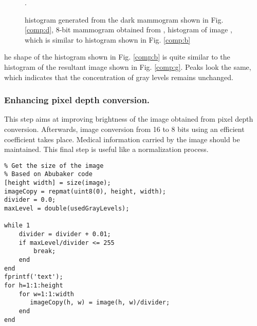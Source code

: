 \begin{figure}[h]
  \begin{center}
    \hspace{12pt}
    \hspace{12pt}
  \end{center}

  \caption{\protect{} histogram generated from the dark mammogram
  shown in Fig. \protect\ref{comp:d}, \protect{}  8-bit mammogram
  obtained from \protect{}, \protect{} histogram of
  image \protect{}, which is similar to histogram shown in Fig.
  \ref{comp:b}}. 
  
  \label{img:shrinking-two} 
\end{figure}

he shape of the histogram shown in Fig. \ref{comp:b} is quite similar
to the histogram of the resultant image shown in Fig. \ref{comp:g}. Peaks look
the same, which indicates that the concentration of gray levels remains
unchanged.

\subsubsection{Enhancing pixel depth conversion.}

This step aims at improving brightness of the image obtained from pixel depth
conversion. Afterwards, image conversion from 16 to 8 bits using an efficient
coefficient takes place. Medical information carried by the image should be
maintained. This final step is useful like a normalization process. 


\begin{verbatim}
% Get the size of the image
% Based on Abubaker code
[height width] = size(image);
imageCopy = repmat(uint8(0), height, width);
divider = 0.0;
maxLevel = double(usedGrayLevels);

while 1
    divider = divider + 0.01;
    if maxLevel/divider <= 255
        break;
    end
end
fprintf('text');
for h=1:1:height
    for w=1:1:width
       imageCopy(h, w) = image(h, w)/divider;
    end
end
\end{verbatim}



